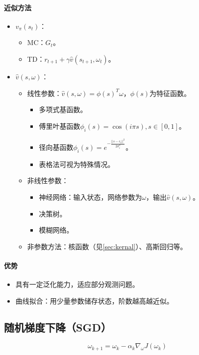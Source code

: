 \documentclass[
12pt, %
a4paper, 
oneside, %
headinclude,footinclude, %
]{scrartcl}
\begin{document}
\paragraph{近似方法}\label{sec:kernal back}
\begin{itemize}
\item $ v_\pi(s_t) $：
\begin{itemize}
\item MC：$ G_t $。
\item TD：$ r_{t + 1} + \gamma \hat{v}(s_{t + 1}, \omega_t) $。
\end{itemize}
\item $ \hat{v}(s, \omega) $：
\begin{itemize}
\item 线性参数：$ \hat{v}(s, \omega) = \phi(s)^T \omega $，$ \phi(s) $为特征函数。
\begin{itemize}
\item 多项式基函数。
\item 傅里叶基函数$ \phi_i(s) = \cos(i \pi s), s \in [0, 1] $。
\item 径向基函数$ \phi_i(s) = e^{-\frac{||s - c_i||^2}{2\sigma_i^2}} $。
\item 表格法可视为特殊情况。
\end{itemize}
\item 非线性参数：
\begin{itemize}
\item 神经网络：输入状态，网络参数为$ \omega $，输出$ \hat{v}(s, \omega) $。
\item 决策树。
\item 模糊网络。
\end{itemize}
\item 非参数方法：核函数（见\ref{sec:kernal}）、高斯回归等。
\end{itemize}
\end{itemize}
\paragraph{优势}
\begin{itemize}
\item 具有一定泛化能力，适应部分观测问题。
\item 曲线拟合：用少量参数储存状态，阶数越高越近似。
\end{itemize}
\subsection[随机梯度下降]{随机梯度下降（SGD）}
$$ \omega_{k + 1} = \omega_k - \alpha_k \nabla_\omega J(\omega_k) $$
\end{document}
